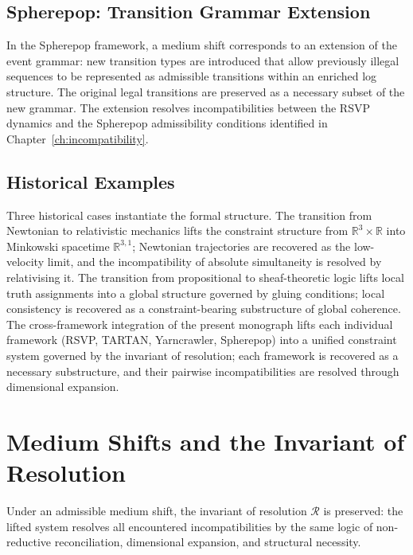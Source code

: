 \documentclass[11pt,openany]{book}
\begin{document}
\subsection{Spherepop: Transition Grammar Extension}

In the Spherepop framework, a medium shift corresponds to
an extension of the event grammar: new transition types
are introduced that allow previously illegal sequences to
be represented as admissible transitions within an
enriched log structure.  The original legal transitions
are preserved as a necessary subset of the new grammar.
The extension resolves incompatibilities between the RSVP
dynamics and the Spherepop admissibility conditions
identified in Chapter~\ref{ch:incompatibility}.

\subsection{Historical Examples}

Three historical cases instantiate the formal structure.
The transition from Newtonian to relativistic mechanics
lifts the constraint structure from
$\mathbb{R}^3 \times \mathbb{R}$ into Minkowski spacetime
$\mathbb{R}^{3,1}$; Newtonian trajectories are recovered
as the low-velocity limit, and the incompatibility of
absolute simultaneity is resolved by relativising it.  The
transition from propositional to sheaf-theoretic logic
lifts local truth assignments into a global structure
governed by gluing conditions; local consistency is
recovered as a constraint-bearing substructure of global
coherence.  The cross-framework integration of the present
monograph lifts each individual framework (RSVP, TARTAN,
Yarncrawler, Spherepop) into a unified constraint system
governed by the invariant of resolution; each framework
is recovered as a necessary substructure, and their
pairwise incompatibilities are resolved through dimensional
expansion.

\section{Medium Shifts and the Invariant of Resolution}
\label{sec:medium-resolution}

\begin{proposition}
\label{prop:resolution-preserved}
Under an admissible medium shift, the invariant of
resolution $\mathcal{R}$ is preserved: the lifted system
resolves all encountered incompatibilities by the same
logic of non-reductive reconciliation, dimensional
expansion, and structural necessity.
\end{proposition}
\end{document}

